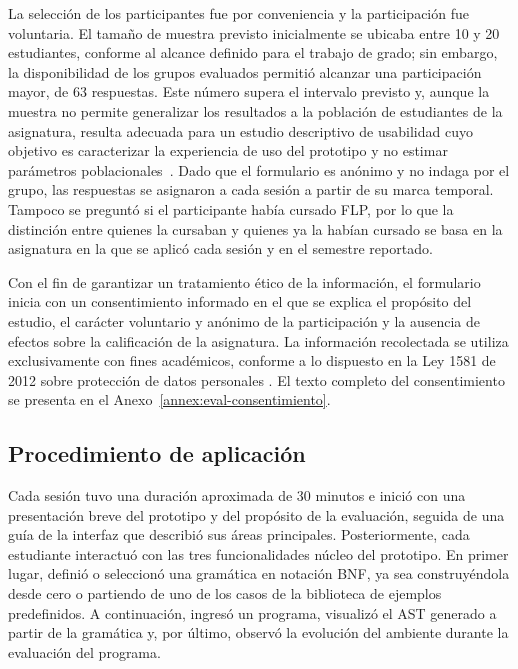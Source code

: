 La selección de los participantes fue por conveniencia y la participación fue voluntaria. El tamaño de muestra previsto inicialmente se ubicaba entre 10 y 20 estudiantes, conforme al alcance definido para el trabajo de grado; sin embargo, la disponibilidad de los grupos evaluados permitió alcanzar una participación mayor, de 63 respuestas. Este número supera el intervalo previsto y, aunque la muestra no permite generalizar los resultados a la población de estudiantes de la asignatura, resulta adecuada para un estudio descriptivo de usabilidad cuyo objetivo es caracterizar la experiencia de uso del prototipo y no estimar parámetros poblacionales~\cite{sauro2016quantifying}. Dado que el formulario es anónimo y no indaga por el grupo, las respuestas se asignaron a cada sesión a partir de su marca temporal. Tampoco se preguntó si el participante había cursado FLP, por lo que la distinción entre quienes la cursaban y quienes ya la habían cursado se basa en la asignatura en la que se aplicó cada sesión y en el semestre reportado.

Con el fin de garantizar un tratamiento ético de la información, el formulario inicia con un consentimiento informado en el que se explica el propósito del estudio, el carácter voluntario y anónimo de la participación y la ausencia de efectos sobre la calificación de la asignatura. La información recolectada se utiliza exclusivamente con fines académicos, conforme a lo dispuesto en la Ley 1581 de 2012 sobre protección de datos personales \cite{colombia2012ley1581}. El texto completo del consentimiento se presenta en el Anexo~\ref{annex:eval-consentimiento}.

\subsection{Procedimiento de aplicación}

Cada sesión tuvo una duración aproximada de 30 minutos e inició con una presentación breve del prototipo y del propósito de la evaluación, seguida de una guía de la interfaz que describió sus áreas principales. Posteriormente, cada estudiante interactuó con las tres funcionalidades núcleo del prototipo. En primer lugar, definió o seleccionó una gramática en notación BNF, ya sea construyéndola desde cero o partiendo de uno de los casos de la biblioteca de ejemplos predefinidos. A continuación, ingresó un programa, visualizó el AST generado a partir de la gramática y, por último, observó la evolución del ambiente durante la evaluación del programa.

